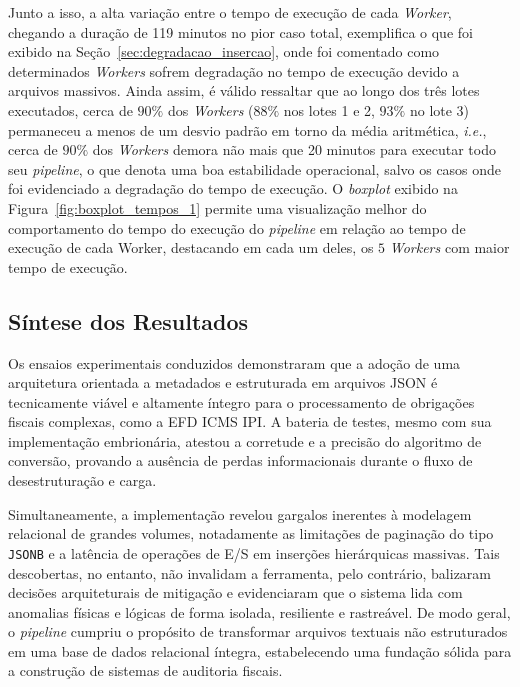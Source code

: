 Junto a isso, a alta variação entre o tempo de execução de cada \textit{Worker},
 chegando a duração de 119 minutos no pior caso total, exemplifica o que foi
 exibido na Seção~\ref{sec:degradacao_insercao}, onde foi comentado como
 determinados \textit{Workers} sofrem degradação no tempo de execução devido a
 arquivos massivos. Ainda assim, é válido ressaltar que ao longo dos três lotes executados, cerca de \( 90\% \) dos \textit{Workers} (\( 88\% \) nos lotes 1
 e 2, \( 93\% \) no lote 3) permaneceu a menos de um desvio padrão em torno da
 média aritmética, \textit{i.e.}, cerca de \( 90\% \) dos \textit{Workers}
 demora não mais que 20 minutos para executar todo seu \textit{pipeline}, o
 que denota uma boa estabilidade operacional, salvo os casos onde foi
 evidenciado a degradação do tempo de execução. O \textit{boxplot} exibido na
 Figura~\ref{fig:boxplot_tempos_1} permite uma visualização melhor do
 comportamento do tempo do execução do \textit{pipeline} em relação ao
 tempo de execução de cada {Worker}, destacando em cada um deles, os
 \( 5 \) \textit{Workers} com maior tempo de execução.

\subsection{Síntese dos Resultados}
\label{sec:discussao_final}

Os ensaios experimentais conduzidos demonstraram que a adoção de uma
arquitetura orientada a metadados e estruturada em arquivos JSON é
tecnicamente viável e altamente íntegro para o processamento de obrigações
fiscais complexas, como a EFD ICMS IPI. A bateria de testes, mesmo com sua
implementação embrionária, atestou a corretude e a precisão do algoritmo de
conversão, provando a ausência de perdas informacionais durante o fluxo de
desestruturação e carga.

Simultaneamente, a implementação revelou gargalos inerentes à modelagem
relacional de grandes volumes, notadamente as limitações de paginação do tipo
\texttt{JSONB} e a latência de operações de E/S em inserções hierárquicas
massivas. Tais descobertas, no entanto, não invalidam a ferramenta,
pelo contrário, balizaram decisões arquiteturais de mitigação e evidenciaram
que o sistema lida com anomalias físicas e lógicas de forma isolada, resiliente
e rastreável. De modo geral, o \textit{pipeline} cumpriu o propósito
de transformar arquivos textuais não estruturados em uma base de dados
relacional íntegra, estabelecendo uma fundação sólida para a construção
de sistemas de auditoria fiscais.


\clearpage
